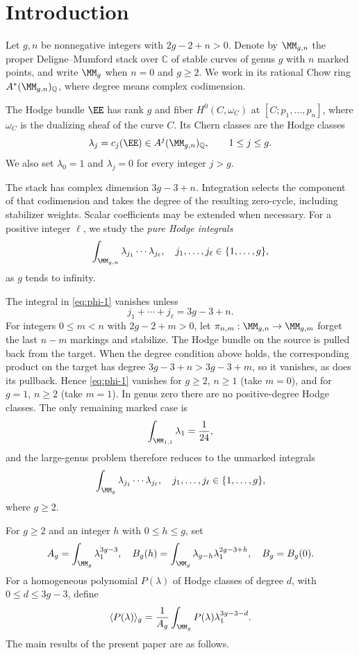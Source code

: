 \section{Introduction}
\label{sec:introduction}
Let $g,n$ be nonnegative integers with $2g-2+n>0$.  Denote by
$\MM_{g,n}$ the proper Deligne--Mumford stack over $\mathbb C$ of
stable curves of genus $g$ with $n$ marked points, and write $\MM_g$
when $n=0$ and $g\geq2$.  We work in its rational Chow ring
$A^*(\MM_{g,n})_{\mathbb Q}$, where degree means complex codimension.

The Hodge bundle $\EE$ has rank $g$ and fiber $H^0(C,\omega_C)$ at
$[C;p_1,\ldots,p_n]$, where $\omega_C$ is the dualizing sheaf of the
curve $C$.  Its Chern classes are the Hodge classes
\[\lambda_j=c_j(\EE)\in A^j(\MM_{g,n})_{\mathbb Q},
\qquad 1\leq j\leq g.\]
We also set $\lambda_0=1$ and $\lambda_j=0$ for every integer $j>g$.

The stack has complex dimension $3g-3+n$.  Integration selects the
component of that codimension and takes the degree of the resulting
zero-cycle, including stabilizer weights.  Scalar
coefficients may be extended when necessary.  For a positive integer
$\ell$, we study the \emph{pure Hodge integrals}
\begin{equation}
\int_{\MM_{g,n}}\lambda_{j_1}\cdots \lambda_{j_\ell},\quad j_1, \dots, j_\ell \in \{1, \dots, g\},
\label{eq:phi-1}
\end{equation}
as $g$ tends to infinity.

The integral in \eqref{eq:phi-1} vanishes unless
\[j_1+\cdots+j_\ell=3g-3+n.\]
For integers $0\leq m<n$ with $2g-2+m>0$, let
$\pi_{n,m}:\MM_{g,n}\to\MM_{g,m}$ forget the last $n-m$ markings
and stabilize.  The Hodge bundle on the source is pulled back from the
target.  When the degree condition above holds, the corresponding
product on the target has degree $3g-3+n>3g-3+m$, so it vanishes,
as does its pullback.  Hence \eqref{eq:phi-1} vanishes for $g\geq2$,
$n\geq1$ (take $m=0$), and for $g=1$, $n\geq2$ (take $m=1$).
In genus zero there are no positive-degree Hodge classes.  The only
remaining marked case is
\[\int_{\MM_{1,1}}\lambda_1=\frac{1}{24},\]
and the large-genus problem therefore reduces to the unmarked integrals
\begin{equation}
\int_{\MM_g}\lambda_{j_1}\cdots \lambda_{j_\ell},
\quad j_1, \dots, j_\ell \in \{1, \dots, g\},
\label{eq:phi-2}
\end{equation}
where $g\ge 2$.

For $g\geq2$ and an integer $h$ with $0\leq h\leq g$, set
\[A_g=\int_{\MM_g}\lambda_1^{3g-3},\quad B_g(h)=\int_{\MM_g}\lambda_{g-h} \lambda_1^{2g-3+h},
\quad B_g=B_g(0).\]
For a homogeneous polynomial $P(\lambda)$ of Hodge classes of degree
$d$, with $0\leq d\leq3g-3$, define
\[\langle P(\lambda) \rangle_g=\frac{1}{A_g}\int_{\MM_g} P(\lambda)\lambda_1^{3g-3-d}.\]
The main results of the present paper are as follows.

